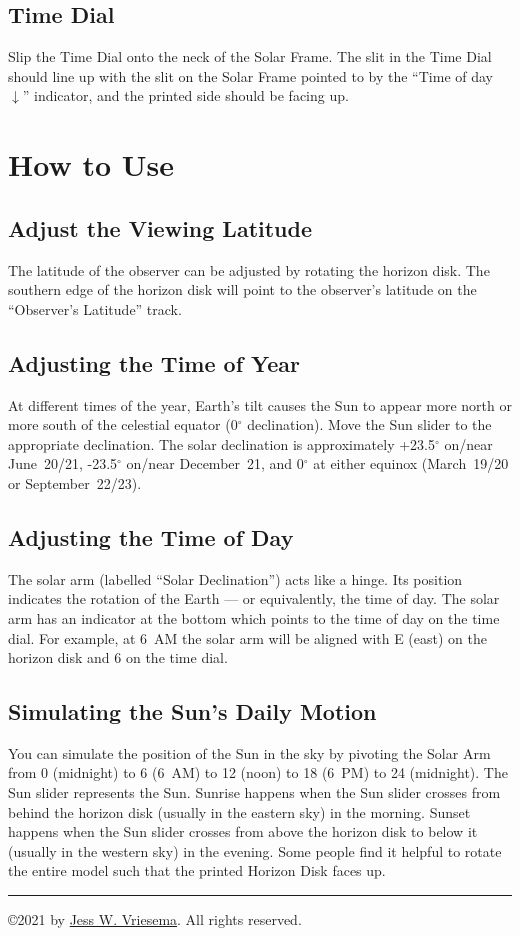 \documentclass[tikz]{article}
\begin{document}
\begin{multicols}{2}
	\subsection{Time Dial}
	Slip the Time Dial onto the neck of the Solar Frame. The slit in the Time Dial should line up with the slit on the Solar Frame pointed to by the ``Time of day $\downarrow$'' indicator, and the printed side should be facing up. 
	
	
	\section{How to Use}
	\subsection{Adjust the Viewing Latitude}
	The latitude of the observer can be adjusted by rotating the horizon disk. The southern edge of the horizon disk will point to the observer's latitude on the ``Observer's Latitude'' track. 
	
	\subsection{Adjusting the Time of Year}
	At different times of the year, Earth's tilt causes the Sun to appear more north or more south of the celestial equator (0$^\circ$ declination). Move the Sun slider to the appropriate declination. The solar declination is approximately +23.5$^\circ$ on/near June~20/21, -23.5$^\circ$ on/near December~21, and 0$^\circ$ at either equinox (March~19/20 or September~22/23). 
	
	\subsection{Adjusting the Time of Day}
	The solar arm (labelled ``Solar Declination'') acts like a hinge. Its position indicates the rotation of the Earth --- or equivalently, the time of day. The solar arm has an indicator at the bottom which points to the time of day on the time dial. For example, at 6~AM the solar arm will be aligned with E (east) on the horizon disk and 6 on the time dial. 
	
	\subsection{Simulating the Sun's Daily Motion}
	You can simulate the position of the Sun in the sky by pivoting the Solar Arm from 0 (midnight) to 6 (6~AM) to 12 (noon) to 18 (6~PM) to 24 (midnight). The Sun slider represents the Sun. Sunrise happens when the Sun slider crosses from behind the horizon disk (usually in the eastern sky) in the morning. Sunset happens when the Sun slider crosses from above the horizon disk to below it (usually in the western sky) in the evening. Some people find it helpful to rotate the entire model such that the printed Horizon Disk faces up.
\vfill
\hrule 
\copyright 2021 by \href{https://www.lpl.arizona.edu/~vriesema/}{Jess W. Vriesema}. All rights reserved. 
	\end{multicols}
\end{document}

